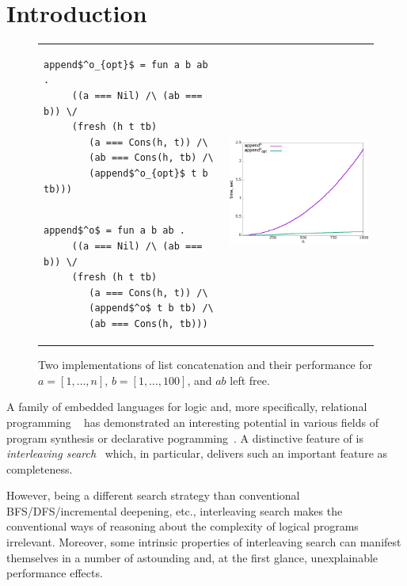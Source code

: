 \section{Introduction}
\label{sec:intro}

\begin{figure}[t]
\begin{tabular}{p{6cm}p{6cm}}
\begin{lstlisting}[basicstyle=\small]
   append$^o_{opt}$ = fun a b ab .
     ((a === Nil) /\ (ab === b)) \/
     (fresh (h t tb)
        (a === Cons(h, t)) /\
        (ab === Cons(h, tb) /\
        (append$^o_{opt}$ t b tb)))
\end{lstlisting} & \multirow{2}{*}[-3mm]{\includegraphics[width=6cm,height=5cm]{append_without_oc.png}} \\[-9mm]
\begin{lstlisting}[basicstyle=\small]
   append$^o$ = fun a b ab .
     ((a === Nil) /\ (ab === b)) \/
     (fresh (h t tb)
        (a === Cons(h, t)) /\
        (append$^o$ t b tb) /\
        (ab === Cons(h, tb)))
\end{lstlisting} &
\end{tabular}
\caption{Two implementations of list concatenation and their performance for $a = [1,\dots,n]$, $b = [1,\dots,100]$, and $ab$ left free.}
\label{fig:length_implementations}
\end{figure}

A family of embedded languages for logic and, more specifically, relational programming \mK~\cite{TRS} has demonstrated an interesting potential in various fields of 
program synthesis or declarative pogramming~\cite{SevenProblems,Quines,Matching}. A distinctive feature of \mK is \emph{interleaving search}~\cite{Transformers} which,
in particular, delivers such an important feature as completeness.

However, being a different search strategy than conventional BFS/DFS/incremental deepening, etc., interleaving search makes the conventional ways of reasoning about the complexity
of logical programs irrelevant. Moreover, some intrinsic properties of interleaving search can manifest themselves in a number of astounding and, at the first glance, unexplainable
performance effects. 

